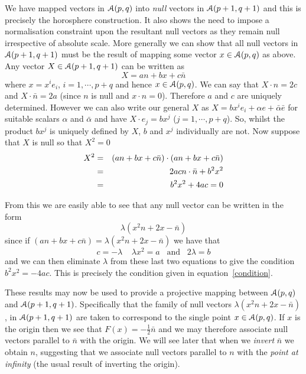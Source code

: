We have mapped vectors in ${\mathcal{A}}(p,q)$ into \emph{null}
vectors in ${\mathcal{A}}(p+1,q+1)$ and this is precisely the horosphere 
construction. It also shows the need to impose a normalisation
constraint upon the resultant null vectors as they remain null 
irrespective of absolute scale.
More generally we can show that all null vectors in $\mathcal{A}(p+1,q+1)$
must be the result of mapping some vector $x \in \mathcal{A}(p,q)$ as above.
Any vector $X \in {\mathcal{A}}(p+1,q+1)$ can be written as
%
\[ X = an + bx + c\bar{n}  \]
%
where $x = x^ie_i$, $i=1,\cdots,p+q$ and hence $x \in \mathcal{A}(p,q)$.
We can say that $X\cdot n = 2c$ and $X\cdot \bar{n}=2a$ (since $n$ is 
null and $x\cdot n = 0$). Therefore $a$
and $c$ are uniquely determined. However we can also write our
general $X$ as  $X=b{x}^ie_i + \alpha e + \bar{\alpha}\bar{e}$ for 
suitable scalars $\alpha$ and $\bar{\alpha}$ and
have $X\cdot e_j= bx^j$ ($j=1,\cdots,p+q$). So, whilst the product
$bx^j$ is uniquely defined by $X$, $b$ and $x^j$ individually are
not. Now suppose that $X$ is null so that $X^2=0$
%
\begin{eqnarray}
X^2 & = &   (an + bx + c\bar{n})\cdot (an + bx + c\bar{n}) \nonumber \\
       & = &  2ac n\cdot \bar{n} + b^2x^2 \nonumber \\
       & = & b^2x^2 + 4ac = 0
       \label{condition}
\end{eqnarray}
%

From this we are easily able to see that any null vector can be
written in the form
%
\begin{equation}
\lambda (x^2n + 2x - \bar{n}) \label{null}
\end{equation} 
%
since if $(an + bx + c\bar{n}) = \lambda(x^2n + 2x -
\bar{n})$ we have that
%
\[c=-\lambda\;\;\;\; \lambda x^2 = a \;\;\;\mbox{and}\;\;\; 2\lambda = b\]
%
and we can then eliminate $\lambda$ from these last two
equations to give the condition $b^2 x^2 = -4ac$. This
is precisely the condition given in
equation~\ref{condition}.

These results may now be used to provide a projective mapping
between ${\mathcal{A}}(p,q)$ and  ${\mathcal{A}}(p+1,q+1)$. Specifically that the
family of null vectors $\lambda(x^2n + 2x - \bar{n})$,
in ${\mathcal{A}}(p+1,q+1)$ are taken to correspond to the
single point $x\in {\mathcal{A}}(p,q)$. If $x$ is the origin
then we see that $F(x) = -\frac{1}{2}\bar{n}$ and we may therefore associate
null vectors parallel to $\bar{n}$ with the origin. 
We will see later that when we \emph{invert} $\bar{n}$ 
we obtain $n$, suggesting
that we associate null vectors parallel to $n$ with the 
\emph{point at infinity} (the usual result of inverting the origin).

